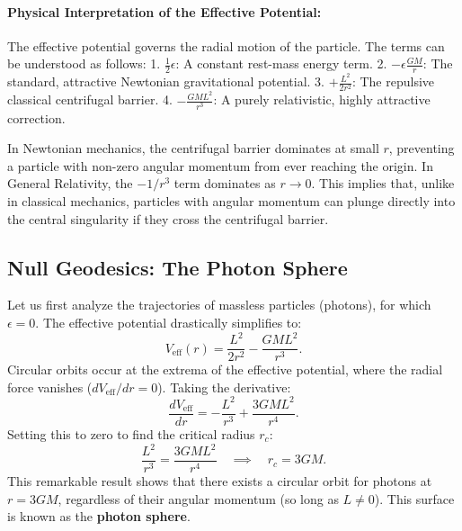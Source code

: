 \documentclass[11pt, a4paper]{report}
\begin{document}
\paragraph{Physical Interpretation of the Effective Potential:}
The effective potential governs the radial motion of the particle. The terms can be understood as follows:
1. $\frac{1}{2}\epsilon$: A constant rest-mass energy term.
2. $-\epsilon\frac{GM}{r}$: The standard, attractive Newtonian gravitational potential.
3. $+\frac{L^{2}}{2r^{2}}$: The repulsive classical centrifugal barrier.
4. $-\frac{GML^{2}}{r^{3}}$: A purely relativistic, highly attractive correction. 

In Newtonian mechanics, the centrifugal barrier dominates at small $r$, preventing a particle with non-zero angular momentum from ever reaching the origin. In General Relativity, the $-1/r^{3}$ term dominates as $r \to 0$. This implies that, unlike in classical mechanics, particles with angular momentum can plunge directly into the central singularity if they cross the centrifugal barrier.


\subsection{Null Geodesics: The Photon Sphere}

Let us first analyze the trajectories of massless particles (photons), for which $\epsilon = 0$. The effective potential drastically simplifies to:
\begin{equation}
V_{\text{eff}}(r) = \frac{L^{2}}{2r^{2}} - \frac{GML^{2}}{r^{3}}.
\end{equation}
Circular orbits occur at the extrema of the effective potential, where the radial force vanishes ($dV_{\text{eff}}/dr = 0$). Taking the derivative:
\begin{equation}
\frac{dV_{\text{eff}}}{dr} = -\frac{L^{2}}{r^{3}} + \frac{3GML^{2}}{r^{4}}.
\end{equation}
Setting this to zero to find the critical radius $r_{c}$:
\begin{equation}
\frac{L^{2}}{r^{3}} = \frac{3GML^{2}}{r^{4}} \quad \implies \quad r_{c} = 3GM.
\end{equation}
This remarkable result shows that there exists a circular orbit for photons at $r = 3GM$, regardless of their angular momentum (so long as $L \neq 0$). This surface is known as the \textbf{photon sphere}. 
\end{document}
